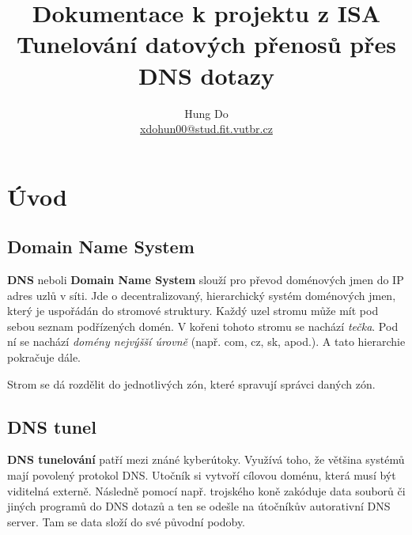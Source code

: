\documentclass[a4paper,11pt]{article}
\title{Dokumentace k projektu z ISA \\
        \large Tunelování datových přenosů přes DNS dotazy}
\author{Hung Do \\ \href{mailto:xdohun00@stud.fit.vutbr.cz}{xdohun00@stud.fit.vutbr.cz}}
\begin{document}
    \maketitle
    \thispagestyle{empty}
    \newpage
    \tableofcontents
    \newpage
    \section{Úvod}
    \subsection{Domain Name System}
    \textbf{DNS} neboli \textbf{Domain Name System} slouží pro převod doménových jmen do IP adres uzlů v síti.
    Jde o decentralizovaný, hierarchický systém doménových jmen, který je uspořádán do stromové struktury.
    Každý uzel stromu může mít pod sebou seznam podřízených domén. V kořeni tohoto stromu se nachází \emph{tečka}.
    Pod ní se nachází \emph{domény nejvýšší úrovně} (např. com, cz, sk, apod.). A tato hierarchie pokračuje dále.

    Strom se dá rozdělit do jednotlivých zón, které spravují správci daných zón.
    \subsection{DNS tunel}
    \textbf{DNS tunelování} patří mezi znáné kyberútoky. Využívá toho, že většina systémů mají povolený protokol
    DNS. Utočník si vytvoří cílovou doménu, která musí být viditelná externě. Následně pomocí např. trojského koně
    zakóduje data souborů či jiných programů do DNS dotazů a ten se odešle na útočníkův autorativní DNS server.
    Tam se data složí do své původní podoby.\cite{DnsTunnel}
\end{document}

